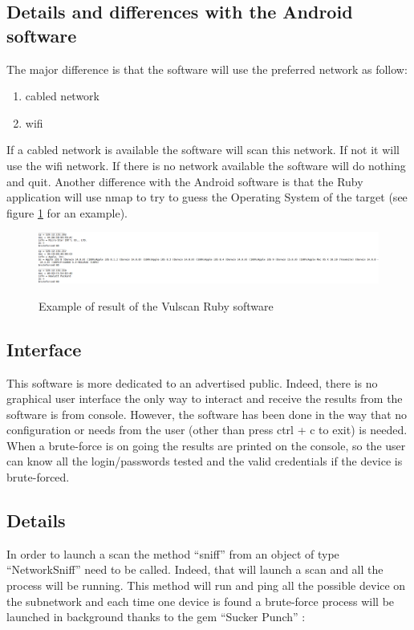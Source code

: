 \documentclass{report}
\begin{document}
\subsection{Details and differences with the Android software}
The major difference is that the software will use the preferred network as follow:
\begin{enumerate}
 \item cabled network
 \item wifi
\end{enumerate}
If a cabled network is available the software will scan this network. If not it will use the wifi network. If there is no network available the software will do nothing and quit.\newline
Another difference with the Android software is that the Ruby application will use nmap to try to guess the Operating System of the target (see figure \ref{fig:result-os} for an example).
\begin{figure}
 \caption{Example of result of the Vulscan Ruby software}
 \centering
 \includegraphics[width=1.2\textwidth]{./img/result-os}
 \label{fig:result-os}
\end{figure}

\subsection{Interface}
This software is more dedicated to an advertised public. Indeed, there is no graphical user interface the only way to interact and receive the results from the software is from console. However, the software has been done in the way that no configuration or needs from the user (other than press ctrl + c to exit) is needed. When a brute-force is on going the results are printed on the console, so the user can know all the login/passwords tested and the valid credentials if the device is brute-forced.

\subsection{Details}
In order to launch a scan the method ``sniff'' from an object of type ``NetworkSniff'' need to be called. Indeed, that will launch a scan and all the process will be running. This method will run and ping all the possible device on the subnetwork and each time one device is found a brute-force process will be launched in background thanks to the gem ``Sucker Punch'' \autocite{suckerpunch}:
\end{document}
